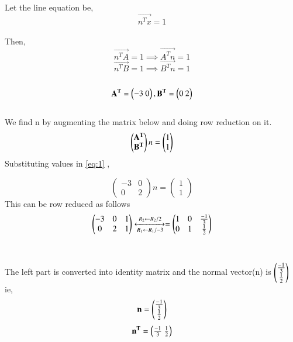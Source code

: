\documentclass[journal,12pt,twocolumn]{IEEEtran}
\begin{document}
\\
\\
\\
Let the line equation be,
\begin{equation}
    \vec{n^Tx}=1
\end{equation}
\\
Then,
\begin{equation}
    \vec{n^TA}=1 \implies \vec{A^Tn}=1
\end{equation}
\begin{equation}
\vec{n^TB}=1 \implies \vec{B^Tn}=1
\end{equation}
\\
\begin{equation}
 \mathbf{A^T}=\begin{pmatrix}-3 \ 0\end{pmatrix} ,  \mathbf{B^T}=\begin{pmatrix}0 \ 2\end{pmatrix}
\end{equation}
\\
We find n by augmenting the matrix below and doing row reduction on it.
\begin{align}
\begin{pmatrix}\mathbf{A^T} \\ \mathbf{B^T}\end{pmatrix}n = \begin{pmatrix}1\\1\end{pmatrix}\label{eq:1}
\end{align}
Substituting values in \ref{eq:1} ,

 \begin{equation}
\left( \begin{array}{cc}
-3 & 0 \\
0 & 2
\end{array} \right)n
=
\left( \begin{array}{cc}
 1\\
1
\end{array} \right)
\end{equation}
This can be row reduced as follows
\begin{equation}
\begin{pmatrix}-3 & 0 & 1\\0 & 2 & 1\end{pmatrix} 
\xleftrightarrow [R_1\leftarrow R_1/-3]{R_2\leftarrow R_2/2}
=
\begin{pmatrix}1 & 0 & \frac{-1}{3}\\0 & 1 & \frac{1}{2}\end{pmatrix}
\end{equation}
\\
\\
The left part is converted into identity matrix and the normal vector(n) is $\begin{pmatrix}\frac{-1}{3}\\\frac{1}{2}\end{pmatrix}$
ie,
\begin{equation}
    \mathbf{n} = \begin{pmatrix}\frac{-1}{3}\\ \frac{1}{2}\end{pmatrix}
\end{equation}
\begin{equation}
\mathbf{n^T}  = \begin{pmatrix}\frac{-1}{3}\ \frac{1}{2}\end{pmatrix}
      \end{equation} 
\end{document}
